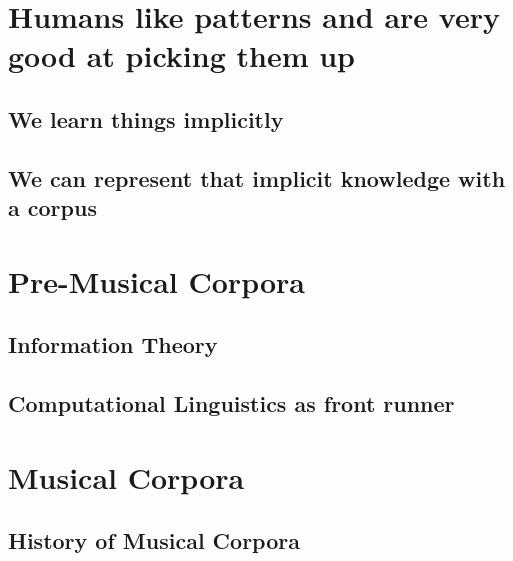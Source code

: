 \documentclass[]{book}
\theoremstyle{definition}
\theoremstyle{definition}
\theoremstyle{definition}
\theoremstyle{remark}
\begin{document}
\hypertarget{humans-like-patterns-and-are-very-good-at-picking-them-up}{%
\section{Humans like patterns and are very good at picking them
up}\label{humans-like-patterns-and-are-very-good-at-picking-them-up}}

\hypertarget{we-learn-things-implicitly}{%
\subsection{We learn things
implicitly}\label{we-learn-things-implicitly}}

\hypertarget{we-can-represent-that-implicit-knowledge-with-a-corpus}{%
\subsection{We can represent that implicit knowledge with a
corpus}\label{we-can-represent-that-implicit-knowledge-with-a-corpus}}

\hypertarget{pre-musical-corpora}{%
\section{Pre-Musical Corpora}\label{pre-musical-corpora}}

\hypertarget{information-theory}{%
\subsection{Information Theory}\label{information-theory}}

\hypertarget{computational-linguistics-as-front-runner}{%
\subsection{Computational Linguistics as front
runner}\label{computational-linguistics-as-front-runner}}

\hypertarget{musical-corpora}{%
\section{Musical Corpora}\label{musical-corpora}}

\hypertarget{history-of-musical-corpora}{%
\subsection{History of Musical
Corpora}\label{history-of-musical-corpora}}
\end{document}
